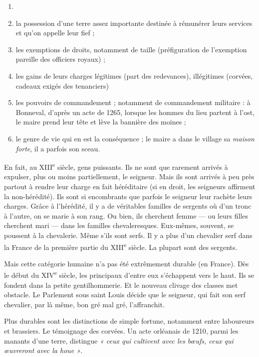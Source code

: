 \documentclass[french,twoside]{book} %
\newcommand{\labelchar}[1]{{\color{rubric}\bf #1}}
\begin{document}
\begin{enumerate}[itemsep=0pt,]
\item[] \hspace{-1.5em}{\bfseries Ce sont :}
\item la possession d’une terre assez importante destinée à rémunérer leurs services et qu’on appelle leur fief ;
\item les exemptions de droits, notamment de taille (préfiguration de l’exemption pareille des officiers royaux) ;
\item les gains de leurs charges légitimes (part des  
\label{p62} redevances), illégitimes (corvées, cadeaux exigés des tenanciers)
\item les pouvoirs de commandement ; notamment de commandement militaire : à Bonneval, d’après un acte de 1265, lorsque les hommes du lieu partent à l’ost, le maire prend leur tête et lève la bannière des moines ;
\item le genre de vie qui en est la conséquence ; le maire a dans le village sa \emph{maison forte}, il a parfois son sceau.

\end{enumerate}\noindent En fait, au XIII\textsuperscript{e} siècle, gens puissants. Ils ne sont que rarement arrivés à expulser, plus ou moins partiellement, le seigneur. Mais ils sont arrivés à peu près partout à rendre leur charge en fait héréditaire (si en droit, les seigneurs affirment la non-hérédité). Ils sont si encombrants que parfois le seigneur leur rachète leurs charges. Grâce à l’hérédité, il y a de véritables familles de sergents où d’un tronc à l’autre, on se marie à son rang. Ou bien, ils cherchent femme — ou leurs filles cherchent mari — dans les familles chevaleresques. Eux-mêmes, souvent, se poussent à la chevalerie. Même s’ils sont serfs. Il y a plus d’un chevalier serf dans la France de la première partie du XIII\textsuperscript{e} siècle. La plupart sont des sergents.\par
Mais cette catégorie humaine n’a pas été extrêmement durable (en France). Dès le début du XIV\textsuperscript{e} siècle, les principaux d’entre eux s’échappent vers le haut. Ils se fondent dans la petite gentilhommerie. Et le nouveau clivage des classes met obstacle. Le Parlement sous saint Louis décide que le seigneur, qui fait son serf chevalier, par là même, bon gré mal gré, l’affranchit.\par
\bigbreak
\noindent \labelchar{b)} Plus durables sont les distinctions de simple fortune, notamment entre laboureurs et brassiers. Le témoignage des corvées. Un acte orléanais de 1210, parmi les manants d’une terre, distingue \emph{« ceux qui cultivent avec les bœufs, ceux qui œuvreront avec la houe »}.
\end{document}
